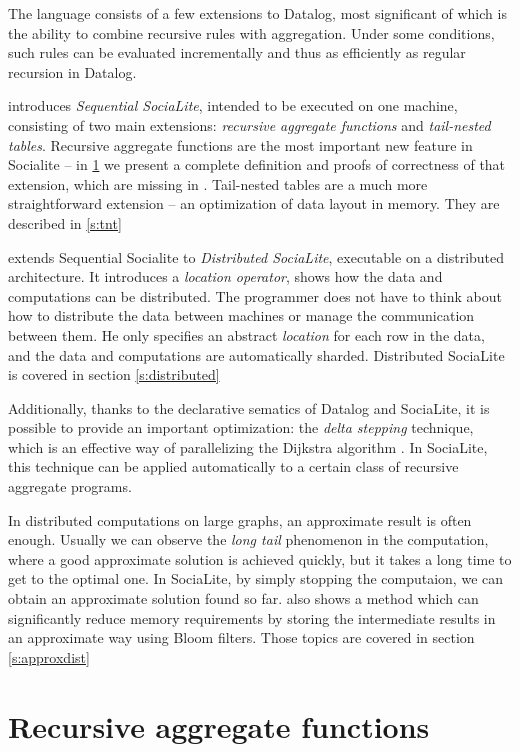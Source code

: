 \documentclass{pracamgr}
\theoremstyle{plain}
\theoremstyle{definition}
\theoremstyle{remark}
\begin{document}
The language consists of a few extensions to Datalog, most significant of which is the ability to combine recursive rules with aggregation. Under some conditions, such rules can be evaluated incrementally and thus as efficiently as regular recursion in Datalog.

\cite{socialite} introduces \emph{Sequential SociaLite}, intended to be executed on one machine, consisting of two main extensions: \emph{recursive aggregate functions} and \emph{tail-nested tables}. Recursive aggregate functions are the most important new feature in Socialite -- in \ref{s:recaggr} we present a complete definition and proofs of correctness of that extension, which are missing in \cite{socialite}. Tail-nested tables are a much more straightforward extension -- an optimization of data layout in memory. They are described in \ref{s:tnt}

\cite{distsoc} extends Sequential Socialite to \emph{Distributed SociaLite}, executable on a distributed architecture. It introduces a \emph{location operator}, shows how the data and computations can be distributed. The programmer does not have to think about how to distribute the data between machines or manage the communication between them. He only specifies an abstract \emph{location} for each row in the data, and the data and computations are automatically sharded. Distributed SociaLite is covered in section \ref{s:distributed}

Additionally, thanks to the declarative sematics of Datalog and SociaLite, it is possible to provide an important optimization: the \emph{delta stepping} technique, which is an effective way of parallelizing the Dijkstra algorithm \cite{deltastep}. In SociaLite, this technique can be applied automatically to a certain class of recursive aggregate programs.

In distributed computations on large graphs, an approximate result is often enough. Usually we can observe the \emph{long tail} phenomenon in the computation, where a good approximate solution is achieved quickly, but it takes a long time to get to the optimal one. In SociaLite, by simply stopping the computaion, we can obtain an approximate solution found so far. \cite{distsoc} also shows a method which can significantly reduce memory requirements by storing the intermediate results in an approximate way using Bloom filters. Those topics are covered in section \ref{s:approxdist}

\section{Recursive aggregate functions}\label{s:recaggr}
\end{document}
